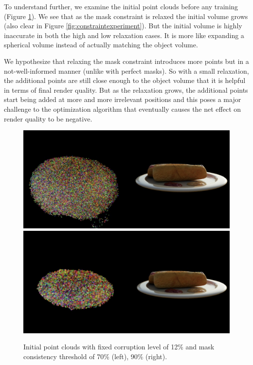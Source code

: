 \documentclass[10pt,twocolumn,letterpaper]{article}
\begin{document}
To understand further, we examine the initial point clouds before any training (Figure \ref{fig:corruptionwrelaxinit}). We see that as the mask constraint is relaxed the initial volume grows (also clear in Figure \ref{fig:constraintexperiment}). But the initial volume is highly inaccurate in both the high and low relaxation cases. It is more like expanding a spherical volume instead of actually matching the object volume. 

We hypothesize that relaxing the mask constraint introduces more points but in a not-well-informed manner (unlike with perfect masks). So with a small relaxation, the additional points are still close enough to the object volume that it is helpful in terms of final render quality. But as the relaxation grows, the additional points start being added at more and more irrelevant positions and this poses a major challenge to the optimization algorithm that eventually causes the net effect on render quality to be negative.

\begin{figure}[h]
\centering
    \includegraphics[width=0.9\linewidth]{figures/corrupt12mask70-init.png}
    \includegraphics[width=0.9\linewidth]{figures/corrupt12mask90-init.png}
    \caption{ Initial point clouds with fixed corruption level of 12\% and mask consistency threshold of 70\% (left), 90\% (right).}
    \label{fig:corruptionwrelaxinit}
\end{figure}
\end{document}

